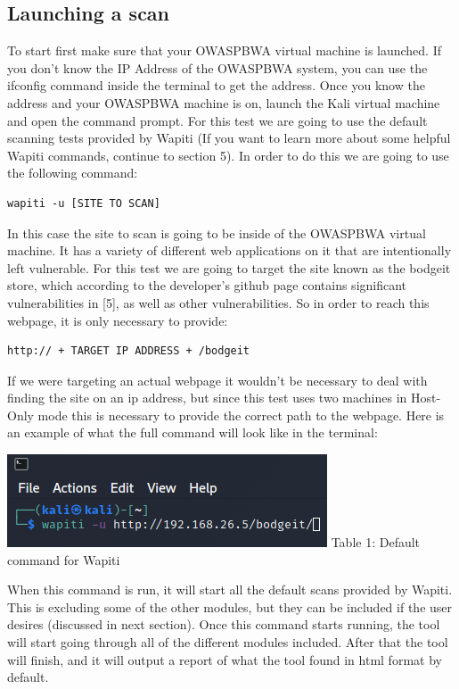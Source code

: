 \subsection{Launching a scan}
To start first make sure that your OWASPBWA virtual machine is launched. If you don't know the IP Address
of the OWASPBWA system, you can use the ifconfig command inside the terminal to get the address. Once you know the address 
and your OWASPBWA machine is on, launch the Kali virtual machine and open the command prompt. For this test we are going to 
use the default scanning tests provided by Wapiti (If you want to learn more about some helpful Wapiti commands, continue
to section 5). In order to do this we are going to use the following command:
\begin{verbatim}
wapiti -u [SITE TO SCAN]
\end{verbatim}
In this case the site to scan is going to be inside of the OWASPBWA virtual machine. It has a variety of different
web applications on it that are intentionally left vulnerable. For this test we are going to target the site known
as the bodgeit store, which according to the developer's github page contains significant vulnerabilities in [5], as well as other vulnerabilities. So in order to reach this webpage,
it is only necessary to provide:
\begin{verbatim}
http:// + TARGET IP ADDRESS + /bodgeit
\end{verbatim} 
If we were targeting an actual webpage it wouldn't be necessary to deal with finding the site on an ip address, but since this test
uses two machines in Host-Only mode this is necessary to provide the correct path to the webpage. Here is an example of what the full
command will look like in the terminal:
\begin{center}
\includegraphics[width=.5\textwidth]{default_cmd.png}
Table 1: Default command for Wapiti
\end{center}
When this command is run, it will start all the default scans provided by Wapiti. This is excluding some of the other modules, but they can
be included if the user desires (discussed in next section). Once this command starts running, the tool will start going through all of the 
different modules included. After that the tool will finish, and it will output a report of what the tool found in html format by default.
